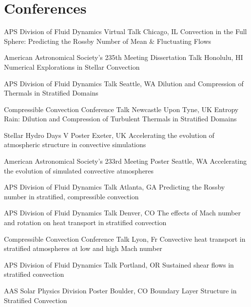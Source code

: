 \section{Conferences}

		{APS Division of Fluid Dynamics}
		{Virtual Talk}
		{Chicago, IL}
		{}
		{Convection in the Full Sphere: Predicting the Rossby Number of Mean \& Fluctuating Flows}


\cventry{}
		{American Astronomical Society's 235th Meeting}
		{Dissertation Talk}
		{Honolulu, HI}
		{}
		{Numerical Explorations in Stellar Convection}

		{APS Division of Fluid Dynamics}
		{Talk}
		{Seattle, WA}
		{}
		{Dilution and Compression of Thermals in Stratified Domains}

\cventry{}
		{Compressible Convection Conference}
		{Talk}
		{Newcastle Upon Tyne, UK}
		{}
		{Entropy Rain: Dilution and Compression of Turbulent Thermals in Stratified Domains}

\cventry{}
		{Stellar Hydro Days V}
		{Poster}
		{Exeter, UK}
		{}
		{Accelerating the evolution of atmospheric structure in convective simulations}

\cventry{}
		{American Astronomical Society's 233rd Meeting}
		{Poster}
		{Seattle, WA}
		{}
		{Accelerating the evolution of simulated convective atmospheres}

		{APS Division of Fluid Dynamics}
		{Talk}
		{Atlanta, GA}
		{}
		{Predicting the Rossby number in stratified, compressible convection}

		{APS Division of Fluid Dynamics}
		{Talk}
		{Denver, CO}
		{}
		{The effects of Mach number and rotation on heat transport in stratified convection}

\cventry{}
		{Compressible Convection Conference}
		{Talk}
		{Lyon, Fr}
		{}
		{Convective heat transport in stratified atmospheres at low and high Mach number}

		{APS Division of Fluid Dynamics}
		{Talk}
		{Portland, OR}
		{}
		{Sustained shear flows in stratified convection}

\cventry{}
		{AAS Solar Physics Division}
		{Poster}
		{Boulder, CO}
		{}
		{Boundary Layer Structure in Stratified Convection}


